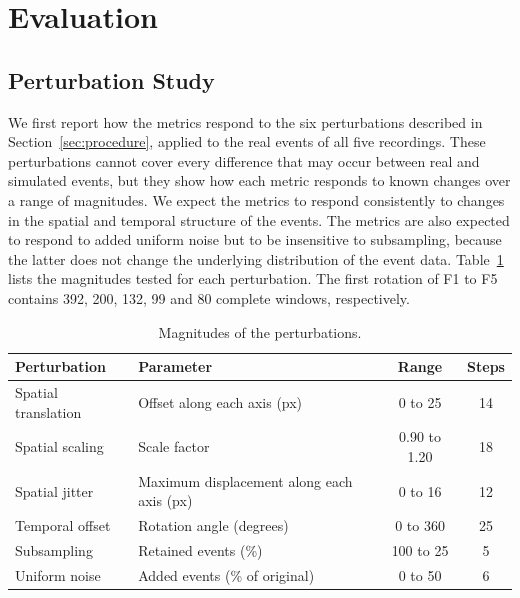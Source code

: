 \section{Evaluation}
\label{sec:evaluation}


\subsection{Perturbation Study}
\label{sec:perturbation}

We first report how the metrics respond to the six perturbations described in Section~\ref{sec:procedure}, applied to the real events of all five recordings. These perturbations cannot cover every difference that may occur between real and simulated events, but they show how each metric responds to known changes over a range of magnitudes. We expect the metrics to respond consistently to changes in the spatial and temporal structure of the events. The metrics are also expected to respond to added uniform noise but to be insensitive to subsampling, because the latter does not change the underlying distribution of the event data. Table~\ref{tab:perturbation-sweeps} lists the magnitudes tested for each perturbation. The first rotation of F1 to F5 contains 392, 200, 132, 99 and 80 complete windows, respectively.

\begin{table}[t]
  \centering
  \caption{Magnitudes of the perturbations.}
  \label{tab:perturbation-sweeps}
  \begin{tabular}{llcc}
    \hline
    Perturbation & Parameter & Range & Steps \\
    \hline
    Spatial translation & Offset along each axis (px) & 0 to 25 & 14 \\
    Spatial scaling & Scale factor & 0.90 to 1.20 & 18 \\
    Spatial jitter & Maximum displacement along each axis (px) & 0 to 16 & 12 \\
    Temporal offset & Rotation angle (degrees) & 0 to 360 & 25 \\
    Subsampling & Retained events (\%) & 100 to 25 & 5 \\
    Uniform noise & Added events (\% of original) & 0 to 50 & 6 \\
    \hline
  \end{tabular}
\end{table}

